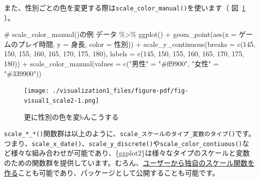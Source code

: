 \documentclass[
  a4paper,
  pandoc,
  ja=standard,
  jafont=haranoaji]{bxjsbook}
\newenvironment{Shaded}{\begin{snugshade}}{\end{snugshade}}
\newcommand{\AttributeTok}[1]{\textcolor[rgb]{0.00,0.48,0.65}{#1}}
\newcommand{\CommentTok}[1]{\textcolor[rgb]{0.37,0.37,0.37}{#1}}
\newcommand{\DecValTok}[1]{\textcolor[rgb]{0.68,0.00,0.00}{#1}}
\newcommand{\FunctionTok}[1]{\textcolor[rgb]{0.28,0.35,0.67}{#1}}
\newcommand{\NormalTok}[1]{\textcolor[rgb]{0.00,0.48,0.65}{#1}}
\newcommand{\OtherTok}[1]{\textcolor[rgb]{0.00,0.48,0.65}{#1}}
\newcommand{\SpecialCharTok}[1]{\textcolor[rgb]{0.37,0.37,0.37}{#1}}
\newcommand{\StringTok}[1]{\textcolor[rgb]{0.13,0.47,0.30}{#1}}
\begin{document}
また、性別ごとの色を変更する際は\texttt{scale\_color\_manual()}を使います（
図~\ref{fig-visual1_scale2} ）。

\begin{Shaded}
\begin{Highlighting}[numbers=left,,]
\CommentTok{\# scale\_color\_manual()の例}
\NormalTok{データ }\SpecialCharTok{\%\textgreater{}\%}
  \FunctionTok{ggplot}\NormalTok{() }\SpecialCharTok{+}
  \FunctionTok{geom\_point}\NormalTok{(}\FunctionTok{aes}\NormalTok{(}\AttributeTok{x =}\NormalTok{ ゲームのプレイ時間, }\AttributeTok{y =}\NormalTok{ 身長, }\AttributeTok{color =}\NormalTok{ 性別)) }\SpecialCharTok{+}
  \FunctionTok{scale\_y\_continuous}\NormalTok{(}\AttributeTok{breaks =} \FunctionTok{c}\NormalTok{(}\DecValTok{145}\NormalTok{, }\DecValTok{150}\NormalTok{, }\DecValTok{155}\NormalTok{, }\DecValTok{160}\NormalTok{, }\DecValTok{165}\NormalTok{, }\DecValTok{170}\NormalTok{, }\DecValTok{175}\NormalTok{, }\DecValTok{180}\NormalTok{),}
                     \AttributeTok{labels =} \FunctionTok{c}\NormalTok{(}\DecValTok{145}\NormalTok{, }\DecValTok{150}\NormalTok{, }\DecValTok{155}\NormalTok{, }\DecValTok{160}\NormalTok{, }\DecValTok{165}\NormalTok{, }\DecValTok{170}\NormalTok{, }\DecValTok{175}\NormalTok{, }\DecValTok{180}\NormalTok{)) }\SpecialCharTok{+}
  \FunctionTok{scale\_color\_manual}\NormalTok{(}\AttributeTok{values =} \FunctionTok{c}\NormalTok{(}\StringTok{"男性"} \OtherTok{=} \StringTok{"\#ff9900"}\NormalTok{, }\StringTok{"女性"} \OtherTok{=} \StringTok{"\#339900"}\NormalTok{))}
\end{Highlighting}
\end{Shaded}

\begin{figure}

{\centering \texttt{[image: ./visualization1\_files/figure-pdf/fig-visual1\_scale2-1.png]}

}

\caption{\label{fig-visual1_scale2}更に性別の色を変bんこうする}

\end{figure}

\texttt{scale\_*\_*()}関数群は以上のように、\texttt{scale\_スケールのタイプ\_変数のタイプ()}です。つまり、\texttt{scale\_x\_date()}、\texttt{scale\_y\_discrete()}や\texttt{scale\_color\_contiuous()}など様々な組み合わせが可能であり、\{ggplot2\}は様々なタイプのスケールと変数のための関数群を提供しています。むろん、\href{https://ggplot2-book.org/extensions.html}{ユーザーから独自のスケール関数を作る}ことも可能であり、パッケージとして公開することも可能です。
\end{document}
